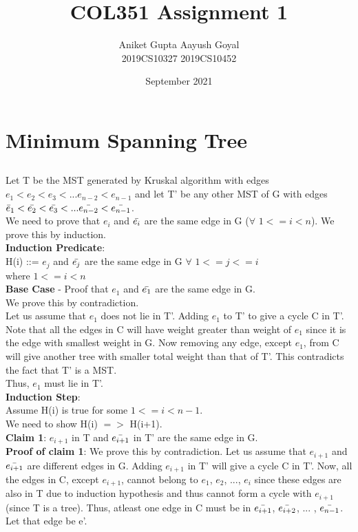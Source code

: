 \documentclass{article}
\title{COL351 Assignment 1}
\author{Aniket Gupta \hspace{2cm}  Aayush Goyal \\
    2019CS10327 \hspace{2.3cm} 2019CS10452}
\date{September 2021}
\begin{document}
\maketitle

\section{Minimum Spanning Tree}
\subsection{}

Let T be the MST generated by Kruskal algorithm with edges $e_{1}<e_2<e_3<...e_{n-2}<e_{n-1}$ and let T' be any other MST of G with edges $\Bar{e}_1<\Bar{e_2}<\Bar{e_3}<...\Bar{e_{n-2}}<\Bar{e_{n-1}}$.
\\
We need to prove that $e_i$ and $\Bar{e_i}$ are the same edge in G ($\forall$ $1<=i<n$). We prove this by induction.\\
\textbf{Induction Predicate}:
\\
H(i) ::= $e_j$ and $\Bar{e_j}$ are the same edge in G $\forall$ $1<=j<=i$
\\
where $1<=i<n$
\\
\textbf{Base Case} - Proof that $e_1$ and $\Bar{e_1}$ are the same edge in G.
\\
We prove this by contradiction.
\\
Let us assume that ${e_1}$ does not lie in T'. Adding ${e_1}$ to T' to give a cycle C in T'. Note that all the edges in C will have weight greater than weight of ${e_1}$ since it is the edge with smallest weight in G. Now removing any edge, except ${e_1}$, from C will give another tree with smaller total weight than that of T'. This contradicts the fact that T' is a MST.\\
Thus, ${e_1}$ must lie in T'.
\\
\textbf{Induction Step}:
\\
Assume H(i) is true for some $1<=i<n-1$.\\
We need to show H(i) $=>$ H(i+1).
\\
\textbf{Claim 1}: $e_{i+1}$ in T and $\Bar{e_{i+1}}$ in T' are the same edge in G.\\
\textbf{Proof of claim 1}:
We prove this by contradiction. Let us assume that $e_{i+1}$ and $\Bar{e_{i+1}}$ are different edges in G. Adding $e_{i+1}$ in T' will give a cycle C in T'. Now, all the edges in C, except $e_{i+1}$, cannot belong to {$e_1$, $e_2$, ..., $e_i$} since these edges are also in T due to induction hypothesis and thus cannot form a cycle with $e_{i+1}$ (since T is a tree). Thus, atleast one edge in C must be in {$\Bar{e_{i+1}}$, $\Bar{e_{i+2}}$, ... , $\Bar{e_{n-1}}$}. Let that edge be e'. \\
\end{document}
